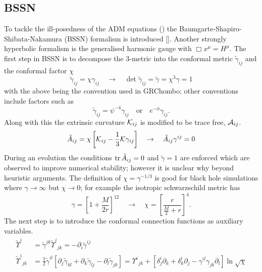 \subsection{BSSN}
To tackle the ill-posedness of the ADM equations () the Baumgarte-Shapiro-Shibata-Nakamura (BSSN) formalism is introduced []. Another strongly hyperbolic formalism is the generalised harmonic gauge \cite{harmonic} with $ \Box x^\mu = H^\mu$. The first step in BSSN is to decompose the 3-metric into the conformal metric $\tilde{\gamma}_{ij}$ and the conformal factor $\chi$
\begin{equation} \tilde{\gamma}_{ij} = \chi \gamma_{ij}\quad\rightarrow\quad \det{\tilde{\gamma}_{ij}} = \tilde{\gamma} = \chi^3\gamma = 1\end{equation}
with the above being the convention used in GRChombo; other conventions include factors such as
\begin{equation}  \tilde{\gamma}_{ij} = \psi^{-4}\gamma_{ij} \quad \mathrm{or} \quad e^{-\phi}\gamma_{ij}.\end{equation}
 Along with this the extrinsic curvature $\mathcal{K}_{ij}$ is modified to be trace free, $\mathcal{A}_{ij}$.
\begin{equation} \tilde{A}_{ij} = \chi\left[ \mathcal{K}_{ij}-\frac{1}{3}\mathcal{K}\gamma_{ij}\right]\quad\rightarrow \quad\tilde{A}_{ij}\gamma^{ij}=0\end{equation}
During an evolution the conditions $\trace{\tilde{A}_{ij}=0}$  and $\tilde{\gamma}=1$ are enforced which are observed to improve numerical stability; however it is unclear why beyond heuristic arguments. The definition of $\chi = \gamma^{-1/3}$ is good for black hole simulations where $\gamma\rightarrow\infty$ but $\chi \rightarrow 0$; for example the isotropic schwarzschild metric has \begin{equation}\gamma = \left[ 1+ \frac{M}{2r}\right]^{12}\quad \rightarrow \quad \chi =\left[ \frac{r}{\frac{M}{2} + r}\right]^4.\end{equation} 
The next step is to introduce the conformal connection functions as auxiliary variables. 
\begin{align} \tilde{\Upsilon}^i &= \tilde{\gamma}^{jk}\tilde{\Upsilon}^i_{\,\;jk} = -\partial_i \tilde{\gamma}^{ij}\\
 \tilde{\Upsilon}^i_{\,\;jk} &= \frac{1}{2}\tilde{\gamma}^{il}\left[ \partial_j \tilde{\gamma}_{kl} + \partial_k \tilde{\gamma}_{lj} - \partial_l \tilde{\gamma}_{jk}\right] = \Upsilon^i_{\;\,jk} + \left[ \delta^i_j \partial_k + \delta^i_k \partial_j - \gamma^{il}\gamma_{jk}\partial_l\right] \ln \sqrt{\chi}\end{align}
